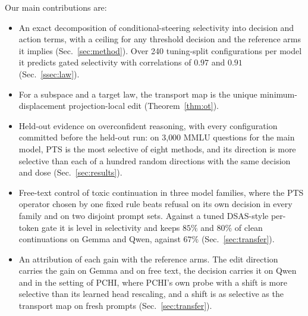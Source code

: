 Our main contributions are:
\begin{itemize}\setlength{\itemsep}{1pt}
\item An exact decomposition of conditional-steering selectivity into
decision and action terms, with a ceiling for any threshold decision and the
reference arms it implies (Sec.~\ref{sec:method}). Over 240 tuning-split
configurations per model it predicts gated selectivity with correlations of
$0.97$ and $0.91$ (Sec.~\ref{ssec:law}).
\item For a subspace and a target law, the transport map is the unique
minimum-displacement projection-local edit (Theorem~\ref{thm:ot}).
\item Held-out evidence on overconfident reasoning, with every configuration
committed before the held-out run: on 3{,}000 MMLU questions for the main model,
PTS is the most selective of eight methods, and its direction is more selective
than each of a hundred random directions with the same decision and dose
(Sec.~\ref{sec:results}).
\item Free-text control of toxic continuation in three model families, where
the PTS operator chosen by one fixed rule beats refusal on its own decision in
every family and on two disjoint prompt sets. Against a tuned DSAS-style
per-token gate it is level in selectivity and keeps $85\%$ and $80\%$ of clean
continuations on Gemma and Qwen, against $67\%$ (Sec.~\ref{sec:transfer}).
\item An attribution of each gain with the reference arms. The edit direction
carries the gain on Gemma and on free text, the decision carries it on Qwen
and in the setting of PCHI, where PCHI's own probe with a shift is more
selective than its learned head rescaling, and a shift is as selective as the
transport map on fresh prompts (Sec.~\ref{sec:transfer}).
\end{itemize}

